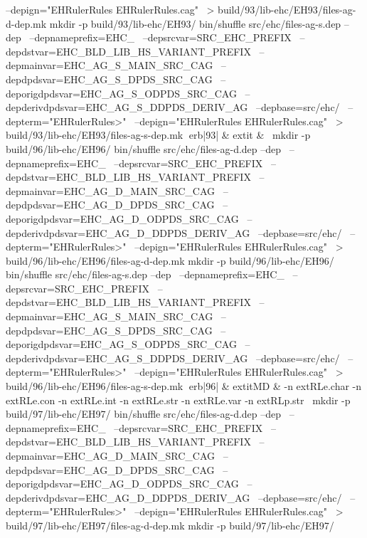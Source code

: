 	  --depign="EHRulerRules EHRulerRules.cag" \
	    > build/93/lib-ehc/EH93/files-ag-d-dep.mk
mkdir -p build/93/lib-ehc/EH93/
bin/shuffle src/ehc/files-ag-s.dep --dep \
	  --depnameprefix=EHC_ \
	  --depsrcvar=SRC_EHC_PREFIX \
	  --depdstvar=EHC_BLD_LIB_HS_VARIANT_PREFIX \
	  --depmainvar=EHC_AG_S_MAIN_SRC_CAG \
	  --depdpdsvar=EHC_AG_S_DPDS_SRC_CAG \
	  --deporigdpdsvar=EHC_AG_S_ODPDS_SRC_CAG \
	  --depderivdpdsvar=EHC_AG_S_DDPDS_DERIV_AG \
	  --depbase=src/ehc/ \
	  --depterm="EHRulerRules>" \
	  --depign="EHRulerRules EHRulerRules.cag" \
	    > build/93/lib-ehc/EH93/files-ag-s-dep.mk
erb|93| & 	extit{} & 
\
mkdir -p build/96/lib-ehc/EH96/
bin/shuffle src/ehc/files-ag-d.dep --dep \
	  --depnameprefix=EHC_ \
	  --depsrcvar=SRC_EHC_PREFIX \
	  --depdstvar=EHC_BLD_LIB_HS_VARIANT_PREFIX \
	  --depmainvar=EHC_AG_D_MAIN_SRC_CAG \
	  --depdpdsvar=EHC_AG_D_DPDS_SRC_CAG \
	  --deporigdpdsvar=EHC_AG_D_ODPDS_SRC_CAG \
	  --depderivdpdsvar=EHC_AG_D_DDPDS_DERIV_AG \
	  --depbase=src/ehc/ \
	  --depterm="EHRulerRules>" \
	  --depign="EHRulerRules EHRulerRules.cag" \
	    > build/96/lib-ehc/EH96/files-ag-d-dep.mk
mkdir -p build/96/lib-ehc/EH96/
bin/shuffle src/ehc/files-ag-s.dep --dep \
	  --depnameprefix=EHC_ \
	  --depsrcvar=SRC_EHC_PREFIX \
	  --depdstvar=EHC_BLD_LIB_HS_VARIANT_PREFIX \
	  --depmainvar=EHC_AG_S_MAIN_SRC_CAG \
	  --depdpdsvar=EHC_AG_S_DPDS_SRC_CAG \
	  --deporigdpdsvar=EHC_AG_S_ODPDS_SRC_CAG \
	  --depderivdpdsvar=EHC_AG_S_DDPDS_DERIV_AG \
	  --depbase=src/ehc/ \
	  --depterm="EHRulerRules>" \
	  --depign="EHRulerRules EHRulerRules.cag" \
	    > build/96/lib-ehc/EH96/files-ag-s-dep.mk
erb|96| & 	extit{MD} & 
-n 	extRL{e.char}\hspace{.5em} 
-n 	extRL{e.con}\hspace{.5em} 
-n 	extRL{e.int}\hspace{.5em} 
-n 	extRL{e.str}\hspace{.5em} 
-n 	extRL{e.var}\hspace{.5em} 
-n 	extRL{p.str}\hspace{.5em} 
\
mkdir -p build/97/lib-ehc/EH97/
bin/shuffle src/ehc/files-ag-d.dep --dep \
	  --depnameprefix=EHC_ \
	  --depsrcvar=SRC_EHC_PREFIX \
	  --depdstvar=EHC_BLD_LIB_HS_VARIANT_PREFIX \
	  --depmainvar=EHC_AG_D_MAIN_SRC_CAG \
	  --depdpdsvar=EHC_AG_D_DPDS_SRC_CAG \
	  --deporigdpdsvar=EHC_AG_D_ODPDS_SRC_CAG \
	  --depderivdpdsvar=EHC_AG_D_DDPDS_DERIV_AG \
	  --depbase=src/ehc/ \
	  --depterm="EHRulerRules>" \
	  --depign="EHRulerRules EHRulerRules.cag" \
	    > build/97/lib-ehc/EH97/files-ag-d-dep.mk
mkdir -p build/97/lib-ehc/EH97/
